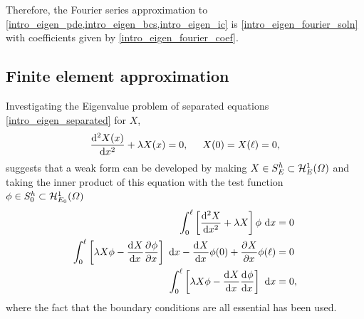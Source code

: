 Therefore, the Fourier series approximation to \cref{intro_eigen_pde,intro_eigen_bcs,intro_eigen_ic} is \cref{intro_eigen_fourier_soln} with coefficients given by \cref{intro_eigen_fourier_coef}.

\subsection{Finite element approximation}

Investigating the Eigenvalue problem of separated equations \cref{intro_eigen_separated} for $X$,
\begin{align*}
  \totder[2]{X(x)}{x} + \lambda X(x) = 0, \hspace{5mm} X(0) = X(\ell) = 0,
\end{align*}
suggests that a weak form can be developed by making $X \in \trialspace$ and taking the inner product of this equation with the test function $\phi \in \testspace$
\begin{align}
  \int_0^{\ell} \left[ \totder[2]{X}{x} + \lambda X \right]\phi \d{x} &= 0 \notag \\
  \int_0^{\ell} \left[ \lambda X \phi - \totder{X}{x} \parder{\phi}{x} \right] \d{x} - \totder{X}{x} \phi(0) + \parder{X}{x} \phi(\ell) &= 0 \notag \\
  \label{intro_eigen_weak_form}
  \int_0^{\ell} \left[ \lambda X \phi - \totder{X}{x} \totder{\phi}{x} \right] \d{x} &= 0,
\end{align}
where the fact that the boundary conditions are all essential has been used.

